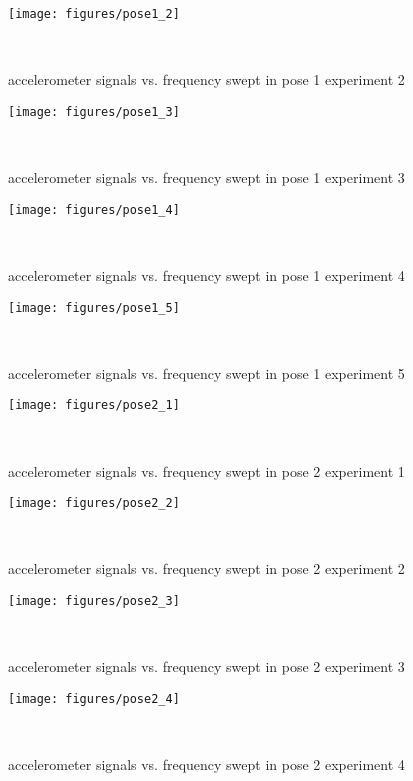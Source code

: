 \documentclass{sigchi}
\begin{document}
\begin{figure*}
  \centering
  \texttt{[image: figures/pose1\_2]}
  \caption{accelerometer signals vs. frequency swept in pose 1 experiment 2}
    ~\label{fig:pose1_2}
\end{figure*}

\begin{figure*}
  \centering
  \texttt{[image: figures/pose1\_3]}
  \caption{accelerometer signals vs. frequency swept in pose 1 experiment 3}
    ~\label{fig:pose1_3}
\end{figure*}

\begin{figure*}
  \centering
  \texttt{[image: figures/pose1\_4]}
  \caption{accelerometer signals vs. frequency swept in pose 1 experiment 4}
    ~\label{fig:pose1_4}
\end{figure*}

\begin{figure*}
  \centering
  \texttt{[image: figures/pose1\_5]}
  \caption{accelerometer signals vs. frequency swept in pose 1 experiment 5}
    ~\label{fig:pose1_5}
\end{figure*}

\begin{figure*}
  \centering
  \texttt{[image: figures/pose2\_1]}
  \caption{accelerometer signals vs. frequency swept in pose 2 experiment 1}
    ~\label{fig:pose2_1}
\end{figure*}

\begin{figure*}
  \centering
  \texttt{[image: figures/pose2\_2]}
  \caption{accelerometer signals vs. frequency swept in pose 2 experiment 2}
    ~\label{fig:pose2_2}
\end{figure*}

\begin{figure*}
  \centering
  \texttt{[image: figures/pose2\_3]}
  \caption{accelerometer signals vs. frequency swept in pose 2 experiment 3}
    ~\label{fig:pose2_3}
\end{figure*}

\begin{figure*}
  \centering
  \texttt{[image: figures/pose2\_4]}
  \caption{accelerometer signals vs. frequency swept in pose 2 experiment 4}
    ~\label{fig:pose2_4}
\end{figure*}
\end{document}
